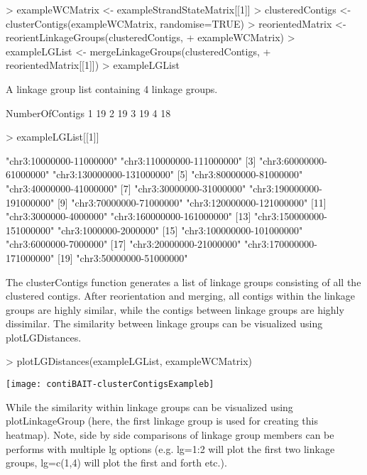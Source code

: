 \documentclass{article}
\begin{document}
\begin{Schunk}
\begin{Sinput}
> exampleWCMatrix <- exampleStrandStateMatrix[[1]]
> clusteredContigs <- clusterContigs(exampleWCMatrix, randomise=TRUE)
> reorientedMatrix <- reorientLinkageGroups(clusteredContigs,
+  exampleWCMatrix)
> exampleLGList <- mergeLinkageGroups(clusteredContigs,
+ reorientedMatrix[[1]])
> exampleLGList
\end{Sinput}
\begin{Soutput}
A linkage group list containing  4  linkage groups.

  NumberOfContigs
1              19
2              19
3              19
4              18
\end{Soutput}
\begin{Sinput}
> exampleLGList[[1]]
\end{Sinput}
\begin{Soutput}
 [1] "chr3:10000000-11000000"   "chr3:110000000-111000000"
 [3] "chr3:60000000-61000000"   "chr3:130000000-131000000"
 [5] "chr3:80000000-81000000"   "chr3:40000000-41000000"  
 [7] "chr3:30000000-31000000"   "chr3:190000000-191000000"
 [9] "chr3:70000000-71000000"   "chr3:120000000-121000000"
[11] "chr3:3000000-4000000"     "chr3:160000000-161000000"
[13] "chr3:150000000-151000000" "chr3:1000000-2000000"    
[15] "chr3:100000000-101000000" "chr3:6000000-7000000"    
[17] "chr3:20000000-21000000"   "chr3:170000000-171000000"
[19] "chr3:50000000-51000000"  
\end{Soutput}
\end{Schunk}


The clusterContigs function generates a list of linkage groups consisting of all the clustered contigs.  After reorientation and merging, all contigs within the linkage groups are highly similar, while the contigs between linkage groups are highly dissimilar.  The similarity between linkage groups can be visualized using plotLGDistances.

\begin{Schunk}
\begin{Sinput}
> plotLGDistances(exampleLGList, exampleWCMatrix)
\end{Sinput}
\end{Schunk}
\texttt{[image: contiBAIT-clusterContigsExampleb]}


While the similarity within linkage groups can be visualized using plotLinkageGroup (here, the first linkage group is used for creating this heatmap). Note, side by side comparisons of linkage group members can be performs with multiple lg options (e.g. lg=1:2 will plot the first two linkage groups, lg=c(1,4) will plot the first and forth etc.).
\end{document}
